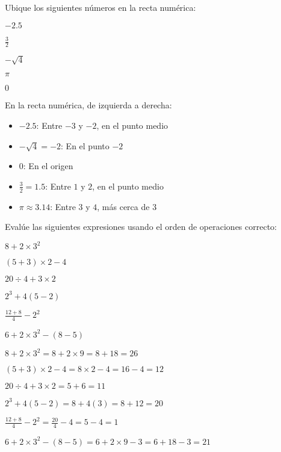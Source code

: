 \begin{exercise}
\problem Ubique los siguientes números en la recta numérica:

\begin{exerciselist}
    \item $-2.5$
    \item $\frac{3}{2}$
    \item $-\sqrt{4}$
    \item $\pi$
    \item $0$
\end{exerciselist}

\begin{solucion}
En la recta numérica, de izquierda a derecha:
\begin{itemize}
    \item $-2.5$: Entre $-3$ y $-2$, en el punto medio
    \item $-\sqrt{4} = -2$: En el punto $-2$
    \item $0$: En el origen
    \item $\frac{3}{2} = 1.5$: Entre $1$ y $2$, en el punto medio
    \item $\pi \approx 3.14$: Entre $3$ y $4$, más cerca de $3$
\end{itemize}
\end{solucion}
\end{exercise}

\begin{exercise}
\problem Evalúe las siguientes expresiones usando el orden de operaciones correcto:

\begin{exerciselist}
    \item $8 + 2 \times 3^2$
    \item $(5 + 3) \times 2 - 4$
    \item $20 \div 4 + 3 \times 2$
    \item $2^3 + 4(5 - 2)$
    \item $\frac{12 + 8}{4} - 2^2$
    \item $6 + 2 \times 3^2 - (8 - 5)$
\end{exerciselist}

\begin{solucion}
\begin{exerciselist}
    \item $8 + 2 \times 3^2 = 8 + 2 \times 9 = 8 + 18 = 26$
    \item $(5 + 3) \times 2 - 4 = 8 \times 2 - 4 = 16 - 4 = 12$
    \item $20 \div 4 + 3 \times 2 = 5 + 6 = 11$
    \item $2^3 + 4(5 - 2) = 8 + 4(3) = 8 + 12 = 20$
    \item $\frac{12 + 8}{4} - 2^2 = \frac{20}{4} - 4 = 5 - 4 = 1$
    \item $6 + 2 \times 3^2 - (8 - 5) = 6 + 2 \times 9 - 3 = 6 + 18 - 3 = 21$
\end{exerciselist}
\end{solucion}
\end{exercise}

